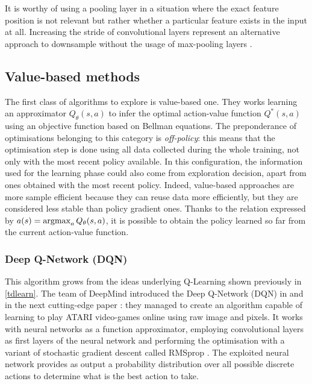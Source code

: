 It is worthy of using a pooling layer in a situation where the exact feature position is not relevant but rather whether a particular feature exists in the input at all.
Increasing the stride of convolutional layers represent an alternative approach to downsample without the usage of max-pooling layers \cite{springenberg2014striving}.


\subsection{Value-based methods}

The first class of algorithms to explore is value-based one. They works learning an approximator $Q_\theta(s,a)$ to infer the optimal action-value function $Q^*(s,a)$ using an objective function based on Bellman equations.
The preponderance of optimisations belonging to this category is \textit{off-policy}: this means that the optimisation step is done using all data collected during the whole training, not only with the most recent policy available. In this configuration, the information used for the learning phase could also come from exploration decision, apart from ones obtained with the most recent policy.
Indeed, value-based approaches are more sample efficient because they can reuse data more efficiently, but they are considered less stable than policy gradient ones.
Thanks to the relation expressed by $a(s) = \operatornamewithlimits{argmax}_a Q_\theta(s,a)$, it is possible to obtain the policy learned so far from the current action-value function.

\subsubsection{Deep Q-Network (DQN)}
This algorithm grows from the ideas underlying Q-Learning \cite{watkins1989learning}  shown previously in \vref{tdlearn}. The team of DeepMind introduced the Deep Q-Network (DQN) in \cite{mnih2013playing} and in the next cutting-edge paper \cite{mnih2015human}: they managed to create an algorithm capable of learning to play ATARI video-games online using raw image and pixels. It works with neural networks as a function approximator, employing convolutional layers as first layers of the neural network and performing the optimisation with a variant of stochastic gradient descent called RMSprop \cite{tieleman2012lecture}. The exploited neural network provides as output a probability distribution over all possible discrete actions to determine what is the best action to take.

